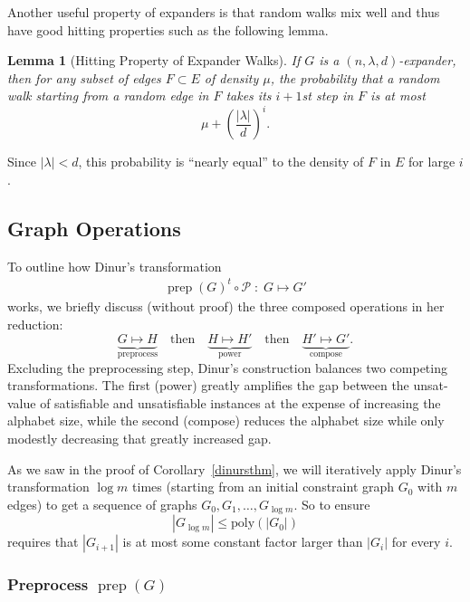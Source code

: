\documentclass{article}
\newtheorem{lemma}[theorem]{Lemma}
\newcommand{\poly}{{\mathrm{poly}}}
\newcommand{\prep}{{\operatorname{prep}}}
\newcommand{\eqdef}{\mathbin{\stackrel{\rm def}{=}}}
\begin{document}
Another useful property of expanders is that random walks mix well and
thus have good hitting properties such as the following lemma. 


\begin{lemma}[Hitting Property of Expander Walks]
If $G$ is a $(n, \lambda, d)$-expander, then for any subset of edges $F \subset E$
of density $\mu$, the probability that a random walk starting from a random edge
in $F$ takes its $i+1$st step in $F$ is at most
$$
\mu + \left(\frac{|\lambda|}{d}\right)^i.
$$
\end{lemma}

Since $|\lambda|<d$, this probability is ``nearly equal'' to the density of
$F$ in $E$ for large $i$.

\subsection{Graph Operations}

To outline how Dinur's transformation
\begin{align*}
\prep(G)^t \circ \mathcal{P} \;:\; G \mapsto G'
\end{align*}
works, we briefly discuss (without proof) the three composed operations in her reduction:
$$
\underbrace{G \mapsto H}_\text{preprocess} \quad\text{then}\quad
\underbrace{H \mapsto H'}_\text{power} \quad\text{then}\quad
\underbrace{H' \mapsto G'}_\text{compose}.
$$
Excluding the preprocessing step, Dinur's construction balances two
competing transformations.  The first (power) greatly amplifies
the gap between the unsat-value of satisfiable and unsatisfiable
instances at the expense of increasing the alphabet size,
while the second (compose) reduces the alphabet size while only
modestly decreasing that greatly increased gap.

As we saw in the proof of Corollary~\ref{dinursthm}, we will iteratively apply
Dinur's transformation $\log m$ times (starting from an initial constraint graph
$G_0$ with $m$ edges) to get a sequence of graphs $G_0, G_1, \dots, G_{\log m}$.
So to ensure
$$
|G_{\log m}| \le \poly(|G_0|)
$$
requires that $|G_{i+1}|$ is at most some constant factor larger
than $|G_i|$ for every $i$.

\subsubsection*{Preprocess $\prep(G)$}
\end{document}

